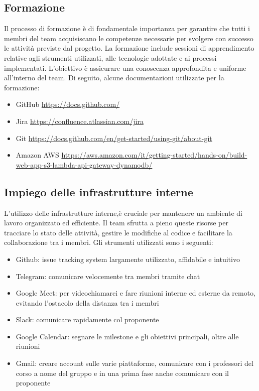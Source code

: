 \documentclass{article}
\begin{document}
\subsection{Formazione}
Il processo di formazione è di fondamentale importanza per garantire che tutti i membri del team acquisiscano le competenze necessarie per svolgere con successo le attività previste dal progetto. La formazione include sessioni di apprendimento relative agli strumenti utilizzati, alle tecnologie adottate e ai processi implementati. L'obiettivo è assicurare una conoscenza approfondita e uniforme all'interno del team. Di seguito, alcune documentazioni utilizzate per la formazione:
\begin{itemize}
    \item GitHub \href{https://docs.github.com/}{https://docs.github.com/}
    \item Jira \href{https://confluence.atlassian.com/jira}{https://confluence.atlassian.com/jira}
    \item Git \href{https://docs.github.com/en/get-started/using-git/about-git}{https://docs.github.com/en/get-started/using-git/about-git}
    \item Amazon AWS \href{https://aws.amazon.com/it/getting-started/hands-on/build-web-app-s3-lambda-api-gateway-dynamodb/}{https://aws.amazon.com/it/getting-started/hands-on/build-web-app-s3-lambda-api-gateway-dynamodb/}
\end{itemize}

\subsection{Impiego delle infrastrutture interne}
L'utilizzo delle infrastrutture interne,è cruciale per mantenere un ambiente di lavoro organizzato ed efficiente. Il team sfrutta a pieno queste risorse per tracciare lo stato delle attività, gestire le modifiche al codice e facilitare la collaborazione tra i membri. Gli strumenti utilizzati sono i seguenti:
\begin{itemize}
    \item Github: issue tracking system largamente utilizzato, affidabile e intuitivo
    \item Telegram: comunicare velocemente tra membri tramite chat
    \item Google Meet: per videochiamarci e fare riunioni interne ed esterne da remoto, evitando l'ostacolo della distanza tra i membri
    \item Slack: comunicare rapidamente col proponente
    \item Google Calendar: segnare le milestone e gli obiettivi principali, oltre alle riunioni
    \item Gmail: creare account sulle varie piattaforme, comunicare con i professori del corso a nome del gruppo e in una prima fase anche comunicare con il proponente
    
\end{itemize}
\end{document}
